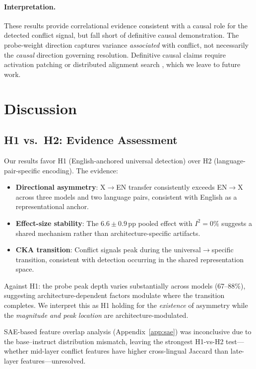 \documentclass{article}
\begin{document}
\paragraph{Interpretation.} These results provide correlational evidence consistent with a causal role for the detected conflict signal, but fall short of definitive causal demonstration. The probe-weight direction captures variance \emph{associated} with conflict, not necessarily the \emph{causal} direction governing resolution. Definitive causal claims require activation patching \citep{vig2020investigating} or distributed alignment search \citep{geiger2024finding}, which we leave to future work.

\section{Discussion}

\subsection{H1 vs.\ H2: Evidence Assessment}

Our results favor H1 (English-anchored universal detection) over H2 (language-pair-specific encoding). The evidence:
\begin{itemize}
    \item \textbf{Directional asymmetry}: X$\to$EN transfer consistently exceeds EN$\to$X across three models and two language pairs, consistent with English as a representational anchor.
    \item \textbf{Effect-size stability}: The $6.6 \pm 0.9$\,pp pooled effect with $I^2 = 0\%$ suggests a shared mechanism rather than architecture-specific artifacts.
    \item \textbf{CKA transition}: Conflict signals peak during the universal$\to$specific transition, consistent with detection occurring in the shared representation space.
\end{itemize}

Against H1: the probe peak depth varies substantially across models (67--88\%), suggesting architecture-dependent factors modulate where the transition completes. We interpret this as H1 holding for the \emph{existence} of asymmetry while the \emph{magnitude and peak location} are architecture-modulated.

SAE-based feature overlap analysis (Appendix~\ref{app:sae}) was inconclusive due to the base--instruct distribution mismatch, leaving the strongest H1-vs-H2 test---whether mid-layer conflict features have higher cross-lingual Jaccard than late-layer features---unresolved.
\end{document}

